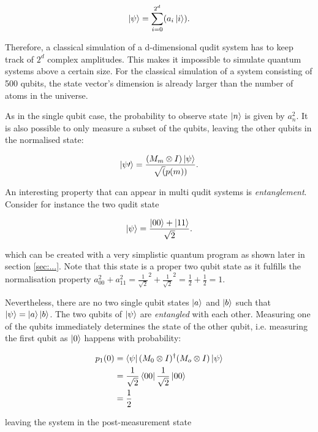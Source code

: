 \begin{equation}
  \Ket{\psi} = \sum_{i=0}^{2^d}(a_i \Ket{i}).
\end{equation}

Therefore, a classical simulation of a d-dimensional qudit system has to keep
track of $2^d$ complex amplitudes. This makes it impossible to simulate quantum
systems above a certain size. For the classical simulation of a system
consisting of 500 qubits, the state vector's dimension is already larger
than the number of atoms in the universe.  

As in the single qubit case, the probability to observe state $\Ket{n}$ is
given by $a_n^2$. It is also possible to only measure a subset of the qubits,
leaving the other qubits in the normalised state:

\begin{equation}
  \Ket{\psi\prime} = \frac{(M_m \otimes I) \Ket{\psi}}{\sqrt(p(m))}.
\end{equation}

An interesting property that can appear in multi qudit systems is
\textit{entanglement}. Consider for instance the two qudit state

\begin{equation}
  \Ket{\psi} = \frac{\Ket{00} + \Ket{11}}{\sqrt{2}}.
\end{equation}

which can be created with a very simplistic quantum program as shown later in
section \ref{sec:...}.
Note that this state is a proper two qubit state as it fulfills the
normalisation property
$a_{00}^2 + a_{11}^2 = \frac{1}{\sqrt{2}}^2 + \frac{1}{\sqrt{2}}^2 = \frac{1}{2}
+ \frac{1}{2} = 1$.

Nevertheless, there are no two single qubit states $\Ket{a}$
and $\Ket{b}$ such that $\Ket{\psi} = \Ket{a} \Ket{b}$. The two qubits of
$\Ket{\psi}$ are \textit{entangled} with each other. Measuring one of the qubits
immediately determines the state of the other qubit, i.e. measuring the first
qubit as $\Ket{0}$ happens with probability:

\begin{align}
  p_1(0) &= \Bra{\psi} (M_0 \otimes I)^{\dagger} (M_o \otimes I) \Ket{\psi} \\
         &= \frac{1}{\sqrt{2}} \Bra{00} \frac{1}{\sqrt{2}} \Ket{00} \\
         &= \frac{1}{2}
\end{align}

leaving the system in the post-measurement state

